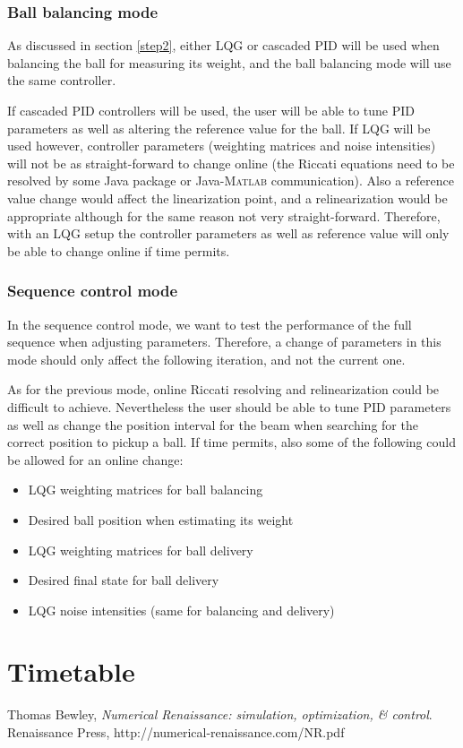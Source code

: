\documentclass{article}
\begin{document}
\subsubsection{Ball balancing mode}
As discussed in section \ref{step2}, either LQG or cascaded PID will be used when balancing the ball for measuring its weight, and the ball balancing mode will use the same controller.

If cascaded PID controllers will be used, the user will be able to tune PID parameters as well as altering the reference value for the ball. If LQG will be used however, controller parameters (weighting matrices and noise intensities) will not be as straight-forward to change online (the Riccati equations need to be resolved by some Java package or Java-\textsc{Matlab} communication). Also a reference value change would affect the linearization point, and a relinearization would be appropriate although for the same reason not very straight-forward. Therefore, with an LQG setup the controller parameters as well as reference value will only be able to change online if time permits.

\subsubsection{Sequence control mode}
In the sequence control mode, we want to test the performance of the full sequence when adjusting parameters. Therefore, a change of parameters in this mode should only affect the following iteration, and not the current one.

As for the previous mode, online Riccati resolving and relinearization could be difficult to achieve. Nevertheless the user should be able to tune PID parameters as well as change the position interval for the beam when searching for the correct position to pickup a ball. If time permits, also some of the following could be allowed for an online change:
\begin{itemize}
\item LQG weighting matrices for ball balancing
\item Desired ball position when estimating its weight
\item LQG weighting matrices for ball delivery
\item Desired final state for ball delivery
\item LQG noise intensities (same for balancing and delivery)
\end{itemize}

\section{Timetable}

\newpage
\begin{thebibliography}{9}
  Thomas Bewley,
  \emph{Numerical Renaissance: simulation, optimization, \& control}.
  Renaissance Press,
  http://numerical-renaissance.com/NR.pdf

\end{thebibliography}
\end{document}
